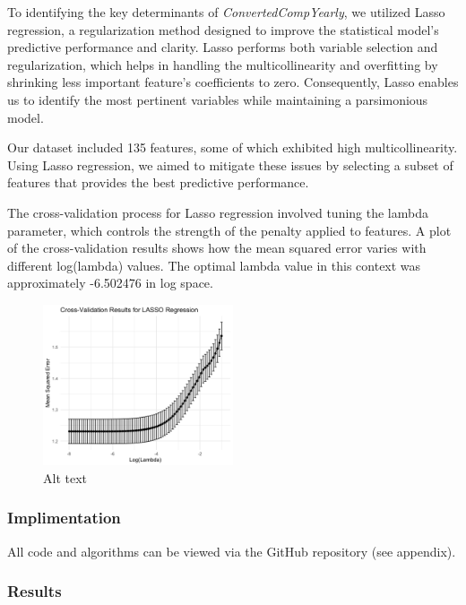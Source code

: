 \documentclass[
  12pt,
]{article}
\begin{document}
To identifying the key determinants of \emph{ConvertedCompYearly}, we
utilized Lasso regression, a regularization method designed to improve
the statistical model's predictive performance and clarity. Lasso
performs both variable selection and regularization, which helps in
handling the multicollinearity and overfitting by shrinking less
important feature's coefficients to zero. Consequently, Lasso enables us
to identify the most pertinent variables while maintaining a
parsimonious model.

Our dataset included 135 features, some of which exhibited high
multicollinearity. Using Lasso regression, we aimed to mitigate these
issues by selecting a subset of features that provides the best
predictive performance.

The cross-validation process for Lasso regression involved tuning the
lambda parameter, which controls the strength of the penalty applied to
features. A plot of the cross-validation results shows how the mean
squared error varies with different log(lambda) values. The optimal
lambda value in this context was approximately -6.502476 in log space.

\begin{figure}
\centering
\includegraphics[width=0.5\textwidth,height=0.5\textheight]{cross_validation_results.png}
\caption{Alt text}
\end{figure}

\hypertarget{implimentation}{%
\subsubsection{Implimentation}\label{implimentation}}

All code and algorithms can be viewed via the GitHub repository (see
appendix).

\hypertarget{results}{%
\subsubsection{Results}\label{results}}
\end{document}
